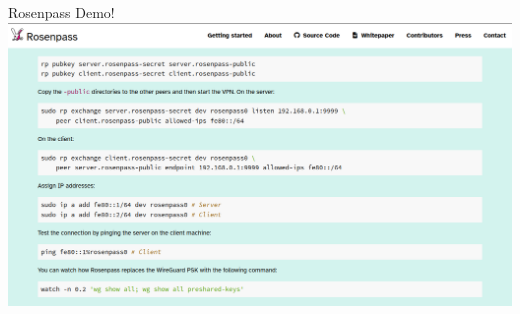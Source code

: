 \documentclass[german]{rosenpass-beamer}
\begin{document}

\begin{frame}{Rosenpass Demo!}
  \includegraphics[height=.9\textheight]{assets/2023-03-20-rg-tutorial-screenshot.png}
\end{frame}



\end{document}
